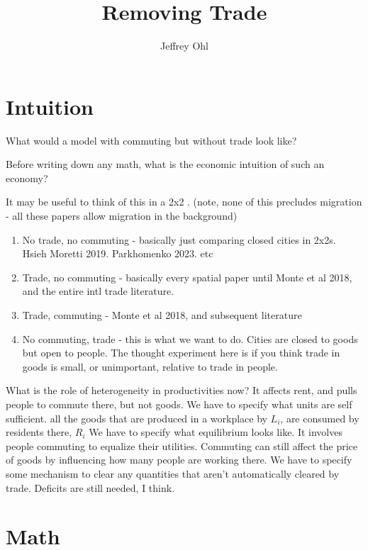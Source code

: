 \documentclass{article}
\title{Removing Trade}
\author{Jeffrey Ohl}
\begin{document}
\maketitle

\begin{abstract}
\end{abstract}

\section{Intuition}
What would a model with commuting but without trade look like?

Before writing down any math, what is the economic intuition of such an economy?

It may be useful to think of this in a 2x2 . (note, none of this precludes migration - all these papers allow migration in the background)
\begin{enumerate}
\item No trade, no commuting - basically just comparing closed cities in 2x2s. Hsieh Moretti 2019. Parkhomenko 2023. etc
\item Trade, no commuting - basically every spatial paper until Monte et al 2018, and the entire intl trade literature.
\item Trade, commuting - Monte et al 2018, and subsequent literature
\item No commuting, trade - this is what we want to do. Cities are closed to goods but open to people. The thought experiment here is if you think trade in goods is small, or unimportant, relative to trade in people.
\end{enumerate}


What is the role of heterogeneity in productivities now? It affects rent, and pulls people to commute there, but not goods. 
We have to specify what units are self sufficient. all the goods that are produced in a workplace by $L_i$, are consumed by residents there, $R_i$
We have to specify what equilibrium looks like. It involves people commuting to equalize their utilities. Commuting can still affect the price of goods by influencing how many people are working there. 
We have to specify some mechanism to clear any quantities that aren't automatically cleared by trade. Deficits are still needed, I think.


\section{Math}
\end{document}
